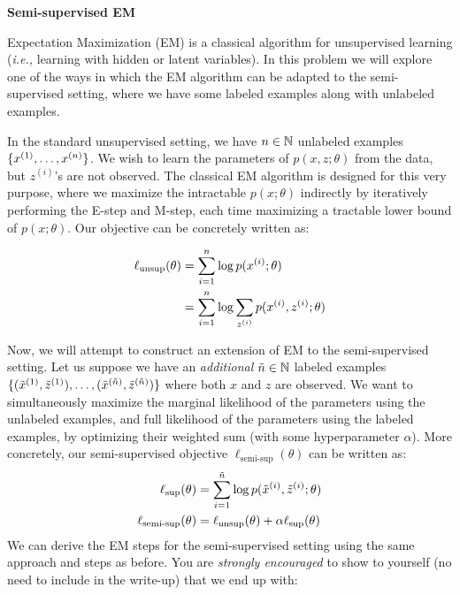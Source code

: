 \item {\bf Semi-supervised EM}

\def\zsi{z^{(i)}}
\def\xsi{x^{(i)}}

Expectation Maximization (EM) is a classical algorithm for unsupervised learning (\emph{i.e.,} learning with hidden or latent variables). In this problem we will explore one of the ways in which the EM algorithm can be adapted to the semi-supervised setting, where we have some labeled examples along with unlabeled examples.

In the standard unsupervised setting, we have ${n} \in \mathbb{N}$ unlabeled examples $\{x^{(1)},\ldots,x^{({n})}\}$. We wish to learn the parameters of $p(x,z;\theta)$ from the data, but $\zsi$'s are not observed. The classical EM algorithm is designed for this very purpose, where we maximize the intractable $p(x;\theta)$ indirectly by iteratively performing the E-step and M-step, each time maximizing a tractable lower bound of $p(x;\theta)$. Our objective can be concretely written as:

\begin{align*}
    \ell_{\text{unsup}}(\theta) &= \sum_{i=1}^\nexp \log p(\xsi;\theta) \\
    &= \sum_{i=1}^\nexp \log \sum_{\zsi} p(\xsi,\zsi;\theta)
\end{align*}


Now, we will attempt to construct an extension of EM to the semi-supervised setting. Let us suppose we have an \emph{additional} $\tilde{{n}} \in \mathbb{N}$ labeled examples $\{(\tilde{x}^{(1)},\tilde{z}^{(1)}),\ldots,(\tilde{x}^{(\tilde{{n}})},\tilde{z}^{(\tilde{{n}})})\}$ where both $x$ and $z$ are observed. We want to simultaneously maximize the marginal likelihood of the parameters using the unlabeled examples, and full likelihood of the parameters using the labeled examples, by optimizing their weighted sum (with some hyperparameter $\alpha$). More concretely, our semi-supervised objective $\ell_\text{semi-sup}(\theta)$ can be written as:
%
\begin{align*}
    \ell_\text{sup}(\theta) &= \sum_{i=1}^{\tilde{{n}}} \log p(\tilde{x}^{(i)},\tilde{z}^{(i)};\theta) \\
    \ell_{\text{semi-sup}}(\theta) &= \ell_\text{unsup}(\theta) + \alpha \ell_\text{sup}(\theta)
\end{align*}
%
We can derive the EM steps for the semi-supervised setting using the same approach and steps as before. You are \emph{strongly encouraged} to show to yourself (no need to include in the write-up) that we end up with:

